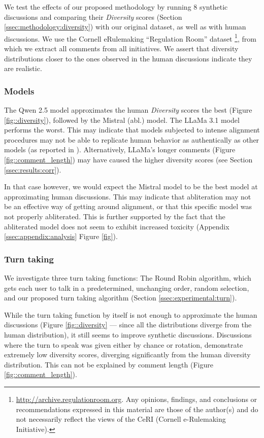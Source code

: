 We test the effects of our proposed methodology by running $8$ synthetic discussions and comparing their \textit{Diversity} scores (Section \ref{ssec:methodology:diversity}) with our original dataset, as well as with human discussions. We use the Cornell eRulemaking “Regulation Room” dataset \footnote{\url{http://archive.regulationroom.org}. Any opinions, findings, and conclusions or recommendations expressed in this material are those of the author(s) and do not necessarily reflect the views of the CeRI (Cornell e-Rulemaking Initiative).}, from which we extract all comments from all initiatives. We assert that diversity distributions closer to the ones observed in the human discussions indicate they are realistic.


\subsubsection{Models}

The Qwen 2.5 model approximates the human \textit{Diversity} scores the best (Figure \ref{fig::diversity}), followed by the Mistral (abl.) model. The LLaMa 3.1 model performs the worst. This may indicate that models subjected to intense alignment procedures may not be able to replicate human behavior as authentically as other models (as reported in \citet{Park2023GenerativeAI}). Alternatively, LLaMa's longer comments (Figure \ref{fig::comment_length}) may have caused the higher diversity scores (see Section \ref{ssec:results:corr}).

In that case however, we would expect the Mistral model to be the best model at approximating human discussions. This may indicate that abliteration may not be an effective way of getting around alignment, or that this specific model was not properly abliterated. This is further supported by the fact that the abliterated model does not seem to exhibit increased toxicity (Appendix \ref{ssec:appendix:analysis} Figure \ref{fig}).


\subsubsection{Turn taking}

We investigate three turn taking functions: The Round Robin algorithm, which gets each user to talk in a predetermined, unchanging order, random selection, and our proposed turn taking algorithm (Section \ref{ssec:experimental:turn}).

While the turn taking function by itself is not enough to approximate the human discussions (Figure \ref{fig::diversity} — since all the distributions diverge from the human distribution), it still seems to improve synthetic discussions. Discussions where the turn to speak was given either by chance or rotation, demonstrate extremely low diversity scores, diverging significantly from the human diversity distribution. This can not be explained by comment length (Figure \ref{fig::comment_length}).


